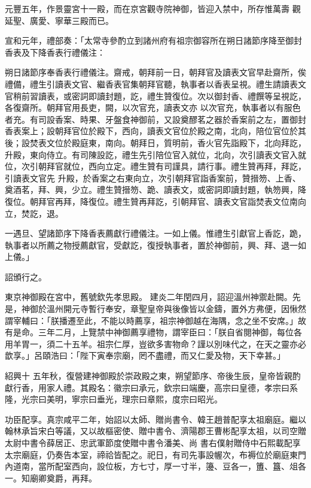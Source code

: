 \begin{pinyinscope}
 元豐五年，作景靈宮十一殿，而在京宮觀寺院神御，皆迎入禁中，所存惟萬壽
 觀延聖、廣愛、寧華三殿而已。



 宣和元年，禮部奏：「太常寺參酌立到諸州府有祖宗御容所在朔日諸節序降至御封香表及下降香表行禮儀注：



 朔日諸節序奉香表行禮儀注。齋戒，朝拜前一日，朝拜官及讀表文官早赴齋所，俟禮備，禮生引讀表文官、繼香表官集朝拜官聽，執事者以香表呈視。禮生請讀表文官稍前習讀表，或密詞即讀封題，訖，禮生贊復位。次以御封香、禮饌等呈視訖，各復齋所。朝拜官用長吏，闕，以次官充，讀表文亦
 以次官充，執事者以有服色者充。有司設香案、時果、牙盤食神御前，又設奠醪茗之器於香案前之左，置御封香表案上；設朝拜官位於殿下，西向，讀表文官位於殿之南，北向，陪位官位於其後；設焚表文位於殿庭東，南向。朝拜日，質明前，香火官先詣殿下，北向拜訖，升殿，東向侍立。有司陳設訖，禮生先引陪位官入就位，北向，次引讀表文官入就位，次引朝拜官就位，西向立定。禮生贊有司謹具，請行事。禮生贊再拜，拜訖，引讀表文官先
 升殿，於香案之右東向立，次引朝拜官詣香案前，贊搢笏、上香、奠酒茗，拜、興，少立。禮生贊搢笏、跪、讀表文，或密詞即讀封題，執笏興，降復位。朝拜官再拜，降復位。禮生贊再拜訖，引朝拜官、讀表文官詣焚表文位南向立，焚訖，退。



 一遇旦、望諸節序下降香表薦獻行禮儀注。一如上儀。惟禮生引獻官上香訖，跪，執事者以所薦之物授薦獻官，受獻訖，復授執事者，置於神御前，興、拜、退一如上儀。」



 詔頒行之。



 東京神御殿在宮中，舊號欽先孝思殿。
 建炎二年閏四月，詔迎溫州神禦赴闕。先是，神御於溫州開元寺暫行奉安，章聖皇帝與後像皆以金鑄，置外方弗便，因愀然謂宰輔曰：「朕播遷至此，不能以時薦享，祖宗神御越在海隅，念之坐不安席。」故有是命。三年二月，上覽禁中神御薦享禮物，謂宰臣曰：「朕自省閱神御，每位各用羊胃一，須二十五羊。祖宗仁厚，豈欲多害物命？謹以別味代之，在天之靈亦必歆享。」呂頤浩曰：「陛下寅奉宗廟，罔不盡禮，而又仁愛及物，天下幸甚。」



 紹興十
 五年秋，復營建神御殿於崇政殿之東，朔望節序、帝後生辰，皇帝皆親酌獻行香，用家人禮。其殿名：徽宗曰承元，欽宗曰端慶，高宗曰皇德，孝宗曰系隆，光宗曰美明，寧宗曰垂光，理宗曰章熙，度宗曰昭光。



 功臣配享。真宗咸平二年，始詔以太師、贈尚書令、韓王趙普配享太祖廟庭。繼以翰林承旨宋白等議，又以故樞密使、贈中書令、濟陽郡王曹彬配享太祖，以司空贈太尉中書令薛居正、忠武軍節度使贈中書令潘美、尚
 書右僕射贈侍中石熙載配享太宗廟庭，仍奏告本室，禘祫皆配之。祀日，有司先事設幄次，布褥位於廟庭東門內道南，當所配室西向，設位板，方七寸，厚一寸半，籩、豆各一，簠、簋、俎各一。知廟卿奠爵，再拜。




\end{pinyinscope}
